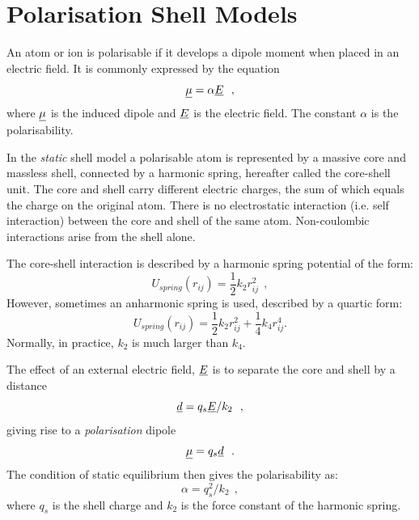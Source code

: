 \section{Polarisation Shell Models}
\label{shell-models}

An atom or ion is polarisable if it develops a
dipole moment when placed in an electric field.  It is commonly
expressed by the equation
\begin{equation}
\mbox{$\underline{\mu}$} = \alpha \mbox{$\underline{E}$}~~,
\end{equation}
where $\mbox{$\underline{\mu}$}$ is the induced dipole and $\mbox{$\underline{E}$}$ is the
electric field.  The constant $\alpha$ is the polarisability.

In the {\em static} shell model a
polarisable atom is represented by
a massive core and massless shell, connected by a harmonic spring,
hereafter called the core-shell unit.  The core and shell carry
different electric charges, the sum of which equals the charge on
the original atom.  There is no electrostatic interaction (i.e.
self interaction) between the core and shell of the same atom.
Non-coulombic interactions arise from the shell alone.

The core-shell interaction is described by a harmonic spring
potential of the form:
\begin{equation}
U_{spring}(r_{ij})=\frac{1}{2}k_{2} r_{ij}^{2}~~,
\end{equation}
However, sometimes an anharmonic spring is used, described by a
quartic form:
\begin{equation}
U_{spring}(r_{ij})=\frac{1}{2}k_{2} r_{ij}^{2}+\frac{1}{4}k_{4} r_{ij}^{4}.
\end{equation}
Normally, in practice, $k_{2}$ is much larger than $k_{4}$.

The effect of an external electric field, $\mbox{$\underline{E}$}$ is to
separate the core and shell by a distance
\begin{equation}
\mbox{$\underline{d}$} = q_{s} \mbox{$\underline{E}$}/k_{2}~~,
\end{equation}
giving rise to a {\em polarisation} dipole
\begin{equation}
\mbox{$\underline{\mu}$} = q_{s} \mbox{$\underline{d}$}~~.
\end{equation}
The condition of static equilibrium then gives the polarisability as:
\begin{equation}
\alpha = q_{s}^{2}/k_{2}~~,
\end{equation}
where $q_{s}$ is the shell charge and $k_{2}$ is the force
constant of the harmonic spring.

